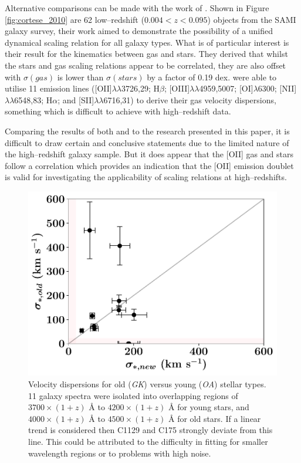 \documentclass[12pt, twocolumn, nofootinbib]{revtex4-1}    %
\begin{document}
Alternative comparisons can be made with the work of \cite{2014ApJ...795L..37C}. Shown in Figure \ref{fig:cortese_2010} are 62 low--redshift ($0.004<z<0.095$) objects from the SAMI galaxy survey, their work aimed to demonstrate the possibility of a unified dynamical scaling relation for all galaxy types. What is of particular interest is their result for the kinematics between gas and stars. They derived that whilst the stars and gas scaling relations appear to be correlated, they are also offset with $\sigma(gas)$ is lower than $\sigma(stars)$ by a factor of 0.19 dex. \cite{2014ApJ...795L..37C} were able to utilise 11 emission lines ([OII]$\lambda\lambda$3726,29; H$\beta$; [OIII]$\lambda\lambda$4959,5007; [OI]$\lambda$6300; [NII]$\lambda\lambda$6548,83; H$\alpha$; and [SII]$\lambda\lambda$6716,31) to derive their gas velocity dispersions, something which is difficult to achieve with high--redshift data. 

Comparing the results of both \cite{2009ApJ...699..638H} and \cite{2014ApJ...795L..37C} to the research presented in this paper, it is difficult to draw certain and conclusive statements due to the limited nature of the high--redshift galaxy sample. But it does appear that the [OII] gas and stars follow a correlation which provides an indication that the [OII] emission doublet is valid for investigating the applicability of scaling relations at high--redshifts.

\begin{figure}
\includegraphics[width=1.0\linewidth]{data/sigma_stars_old_vs_new}
\caption{Velocity dispersions for old (\textit{GK}) versus young (\textit{OA}) stellar types. 11 galaxy spectra were isolated into overlapping regions of $3700\times (1+z)$ {\AA} to $4200\times(1+z)$ {\AA} for young stars, and $4000\times (1+z)$ {\AA} to $4500\times(1+z)$ {\AA} for old stars. If a linear trend is considered then C1129 and C175 strongly deviate from this line. This could be attributed to the difficulty in fitting for smaller wavelength regions or to problems with high noise. }
\label{fig:velocity_dispersions_old_new}
\end{figure} 
\end{document}
